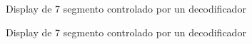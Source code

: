 \documentclass{mylib/reporteConCalif}
\begin{document}
\begin{figure}[H]%
    \centering
    \qquad
    \caption{Display de 7 segmento controlado por un decodificador}%
    \label{fig:example}%
\end{figure}

\begin{figure}[H]%
    \centering
    \qquad
    \caption{Display de 7 segmento controlado por un decodificador}%
    \label{fig:example}%
\end{figure}
\end{document}
